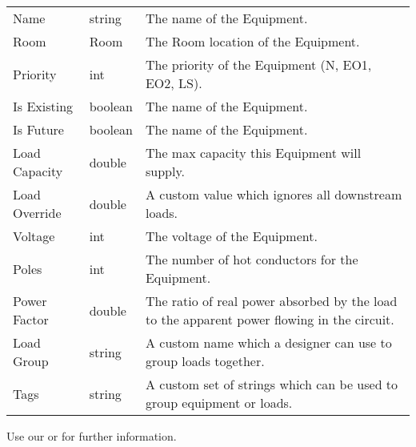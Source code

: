\documentclass[letterpaper,10pt,english]{sphinxmanual}
\begin{document}
\begin{savenotes}\sphinxattablestart
\centering
\begin{tabulary}{\linewidth}[t]{|T|T|T|}
\hline
\sphinxstyletheadfamily 
{}
&\sphinxstyletheadfamily 
{}
&\sphinxstyletheadfamily 
{}
\\
\hline
Name
&
string
&
The name of the Equipment.
\\
\hline
Room
&
Room
&
The Room location of the Equipment.
\\
\hline
Priority
&
int
&
The priority of the Equipment (N, EO1, EO2, LS).
\\
\hline
Is Existing
&
boolean
&
The name of the Equipment.
\\
\hline
Is Future
&
boolean
&
The name of the Equipment.
\\
\hline
Load Capacity
&
double
&
The max capacity this Equipment will supply.
\\
\hline
Load Override
&
double
&
A custom value which ignores all downstream loads.
\\
\hline
Voltage
&
int
&
The voltage of the Equipment.
\\
\hline
Poles
&
int
&
The number of hot conductors for the Equipment.
\\
\hline
Power Factor
&
double
&
The ratio of real power absorbed by the load to the apparent power flowing in the circuit.
\\
\hline
Load Group
&
string
&
A custom name which a designer can use to group loads together.
\\
\hline
Tags
&
string
&
A custom set of strings which can be used to group equipment or loads.
\\
\hline
\end{tabulary}
\par
\sphinxattableend\end{savenotes}

Use our  or  for further information.



\renewcommand{\indexname}{Index}
\printindex
\end{document}
